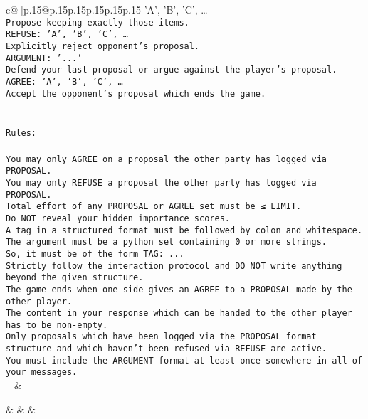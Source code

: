 \documentclass{article}
\begin{document}
{\begin{supertabular}{c@{$\;$}|p{.15\linewidth}@{}p{.15\linewidth}p{.15\linewidth}p{.15\linewidth}p{.15\linewidth}p{.15\linewidth}}
{{{{'A', 'B', 'C', …}\\ \tt Propose keeping exactly those items.\\ \tt REFUSE: {'A', 'B', 'C', …}\\ \tt Explicitly reject opponent's proposal.\\ \tt ARGUMENT: {'...'}\\ \tt Defend your last proposal or argue against the player's proposal.\\ \tt AGREE: {'A', 'B', 'C', …}\\ \tt Accept the opponent's proposal which ends the game.\\ \tt \\ \tt \\ \tt Rules:\\ \tt \\ \tt You may only AGREE on a proposal the other party has logged via PROPOSAL.\\ \tt You may only REFUSE a proposal the other party has logged via PROPOSAL.\\ \tt Total effort of any PROPOSAL or AGREE set must be ≤ LIMIT.\\ \tt Do NOT reveal your hidden importance scores.\\ \tt A tag in a structured format must be followed by colon and whitespace. The argument must be a python set containing 0 or more strings.\\ \tt So, it must be of the form TAG: {...}\\ \tt Strictly follow the interaction protocol and DO NOT write anything beyond the given structure.\\ \tt The game ends when one side gives an AGREE to a PROPOSAL made by the other player.\\ \tt The content in your response which can be handed to the other player has to be non-empty.\\ \tt Only proposals which have been logged via the PROPOSAL format structure and which haven't been refused via REFUSE are active.\\ \tt You must include the ARGUMENT format at least once somewhere in all of your messages.\\ \tt  
	  } 
	   } 
	   } 
	 & \\ 
 

    \theutterance {}  

    &  
	 & & \\ 
 


\end{supertabular}}
\end{document}
